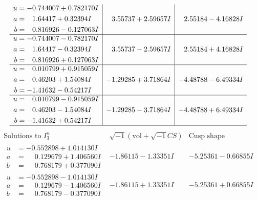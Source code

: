 \documentclass[1p]{elsarticle_modified}
\theoremstyle{definition}
\newcommand{\I}{\sqrt{-1}}
\begin{document}
$$\begin{array}{c|c|c}
\begin{aligned}
u &= -0.744007 + 0.782170 I \\
a &= \phantom{-}1.64417 + 0.32394 I \\
b &= \phantom{-}0.816926 - 0.127063 I\end{aligned}
 & \phantom{-}3.55737 + 2.59657 I & \phantom{-}2.55184 - 4.16828 I \\ \hline\begin{aligned}
u &= -0.744007 - 0.782170 I \\
a &= \phantom{-}1.64417 - 0.32394 I \\
b &= \phantom{-}0.816926 + 0.127063 I\end{aligned}
 & \phantom{-}3.55737 - 2.59657 I & \phantom{-}2.55184 + 4.16828 I \\ \hline\begin{aligned}
u &= \phantom{-}0.010799 + 0.915059 I \\
a &= \phantom{-}0.46203 + 1.54084 I \\
b &= -1.41632 - 0.54217 I\end{aligned}
 & -1.29285 + 3.71864 I & -4.48788 - 6.49334 I \\ \hline\begin{aligned}
u &= \phantom{-}0.010799 - 0.915059 I \\
a &= \phantom{-}0.46203 - 1.54084 I \\
b &= -1.41632 + 0.54217 I\end{aligned}
 & -1.29285 - 3.71864 I & -4.48788 + 6.49334 I\\
 \hline 
 \end{array}$$\newpage$$\begin{array}{c|c|c}  
\text{Solutions to }I^u_{3}& \I (\text{vol} + \sqrt{-1}CS) & \text{Cusp shape}\\
 \hline 
\begin{aligned}
u &= -0.552898 + 1.014130 I \\
a &= \phantom{-}0.129679 + 1.406560 I \\
b &= \phantom{-}0.768179 + 0.377090 I\end{aligned}
 & -1.86115 - 1.33351 I & -5.25361 - 0.66855 I \\ \hline\begin{aligned}
u &= -0.552898 - 1.014130 I \\
a &= \phantom{-}0.129679 - 1.406560 I \\
b &= \phantom{-}0.768179 - 0.377090 I\end{aligned}
 & -1.86115 + 1.33351 I & -5.25361 + 0.66855 I \\ \hline\begin{aligned}

\end{aligned}
\end{array}$$
\end{document}
